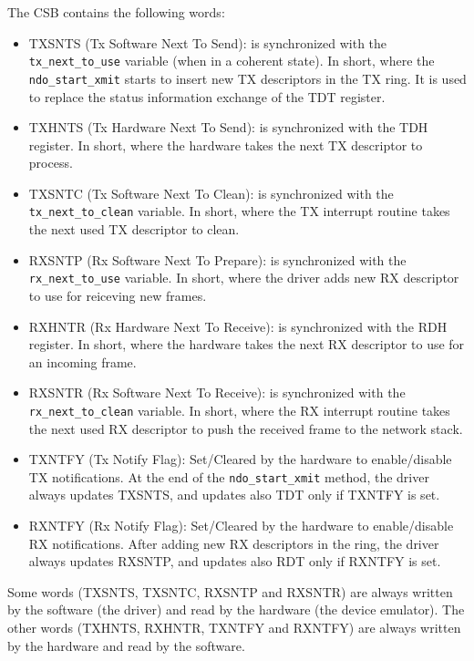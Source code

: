 The CSB contains the following words:
\begin{itemize}
  \item TXSNTS (Tx Software Next To Send): is synchronized with the \texttt{tx\_next\_to\_use} variable (when in a coherent state). In 
	short, where the \texttt{ndo\_start\_xmit} starts to insert new TX descriptors in the TX ring. It is used to replace the status
	information exchange of the TDT register.
	
  \item TXHNTS (Tx Hardware Next To Send): is synchronized with the TDH register. In short, where the hardware takes the next TX descriptor
	to process.
	
  \item TXSNTC (Tx Software Next To Clean): is synchronized with the \texttt{tx\_next\_to\_clean} variable. In short, where the TX interrupt
	routine takes the next used TX descriptor to clean.
	
  \item RXSNTP (Rx Software Next To Prepare): is synchronized with the \texttt{rx\_next\_to\_use} variable. In short, where the driver
	adds new RX descriptor to use for reiceving new frames.
	
  \item RXHNTR (Rx Hardware Next To Receive): is synchronized with the RDH register. In short, where the hardware takes the next RX
	descriptor to use for an incoming frame.
	
  \item RXSNTR (Rx Software Next To Receive): is synchronized with the \texttt{rx\_next\_to\_clean} variable. In short, where the RX 
	interrupt routine takes the next used RX descriptor to push the received frame to the network stack.
	
  \item TXNTFY (Tx Notify Flag): Set/Cleared by the hardware to enable/disable TX notifications. At the end of the
	\texttt{ndo\_start\_xmit} method, the driver always updates TXSNTS, and updates also TDT only if TXNTFY is set.
	
  \item RXNTFY (Rx Notify Flag): Set/Cleared by the hardware to enable/disable RX notifications. After adding new RX
	descriptors in the ring, the driver always updates RXSNTP, and updates also RDT only if RXNTFY is set.
\end{itemize}

Some words (TXSNTS, TXSNTC, RXSNTP and RXSNTR) are always written by the software (the driver) and read by the hardware (the device 
emulator).
The other words (TXHNTS, RXHNTR, TXNTFY and RXNTFY) are always written by the hardware and read by the software.

